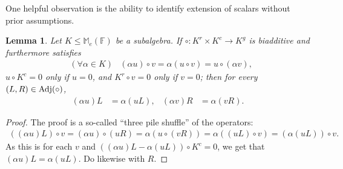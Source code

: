\documentclass[11pt]{article}
\numberwithin{equation}{section}
\theoremstyle{definition}
\theoremstyle{plain}
\numberwithin{equation}{section}
\theoremstyle{plain}       %
\newtheorem{lem}[equation]{Lemma}
\theoremstyle{remark}
\theoremstyle{definition}
\numberwithin{figure}{section}
\numberwithin{table}{section}
\newcommand{\bbF}{\mathbb{F}}  %
\begin{document}
One helpful observation is the ability to identify extension of scalars without
prior assumptions.

\begin{lem}\label{lem:centroid}
	Let $K\leq \mathbb{M}_e(\bbF)$ be a subalgebra.
	If $\circ:K^r\times K^c \to K^g$ is biadditive and furthermore satisfies
	\begin{align*}
		&(\forall \alpha\in K) & (\alpha u)\circ v = \alpha(u\circ v) 
			= u\circ(\alpha v),
	\end{align*}
	$u\circ K^c=0$ only if $u=0$, and $K^r\circ v=0$ only if $v=0$;
	then for every $(L,R)\in {\rm Adj}(\circ)$,
	\begin{align*}
		(\alpha u)L& =\alpha(uL), & (\alpha v)R &= \alpha(vR).
	\end{align*}
\end{lem}
\begin{proof} The proof is a so-called ``three pile shuffle'' of the operators:
	\begin{align*}
		((\alpha u)L)\circ v = (\alpha u)\circ (uR)
		=\alpha (u\circ (vR)) 
		= \alpha( (uL)\circ v)
		= (\alpha (uL))\circ v.
	\end{align*}
	As this is for each $v$ and $((\alpha u)L-\alpha (uL))\circ K^c=0$, we get
	that $(\alpha u)L=\alpha (uL)$.  Do likewise with $R$.
\end{proof}
\end{document}
